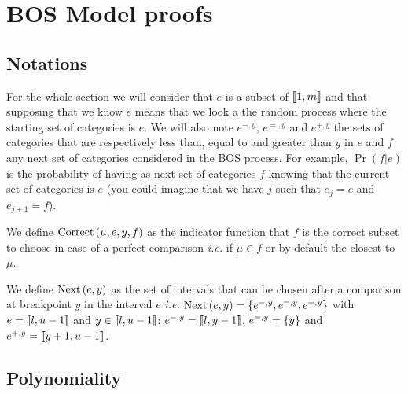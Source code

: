 \section{BOS Model proofs}
\label{appendix:bos_proofs}

\subsection{Notations}

For the whole section we will consider that $e$ is a subset of $\left\llbracket1, m\right\rrbracket$ and that supposing that we know $e$ means that we look a the random process where the starting set of categories is $e$. We will also note $e^{-,y}$, $e^{=,y}$ and $e^{+,y}$ the sets of categories that are respectively less than, equal to and greater than $y$ in $e$ and $f$ any next set of categories considered in the BOS process. For example,  $\Pr(f | e)$ is the probability of having as next set of categories $f$ knowing that the current set of categories is $e$ (you could imagine that we have $j$ such that $e_j = e$ and $e_{j+1} = f$).

\begin{definition}
    We define $\text{Correct}\left(\mu, e, y, f\right)$ as the indicator function that $f$ is the correct subset to choose in case of a perfect comparison \textit{i.e.} if $\mu \in f$ or by default the closest to $\mu$.
\end{definition}

\begin{definition}
    We define $\text{Next}\left(e, y\right)$ as the set of intervals that can be chosen after a comparison at breakpoint $y$ in the interval $e$ \textit{i.e.} $\text{Next}\left(e, y\right) = \left\{ e^{-,y}, e^{=,y}, e^{+,y} \right\}$ with $e = \left\llbracket l, u - 1\right\rrbracket$ and $y \in \left\llbracket l, u - 1\right\rrbracket$: $e^{-,y} = \left\llbracket l, y - 1\right\rrbracket$, $e^{=,y} = \left\{ y \right\}$ and $e^{+,y} = \left\llbracket y + 1, u - 1\right\rrbracket$.
\end{definition}


\subsection{Polynomiality}

